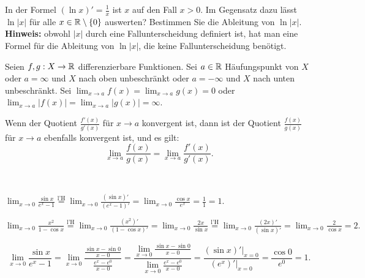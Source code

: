 \begin{aufg} 
	In der Formel $(\ln x)' =\frac{1}{x}$ ist $x$ auf den Fall $x>0$. Im Gegensatz dazu lässt $\ln |x|$ für alle $x \in \mathbb{R} \setminus \{0\}$ auswerten? Bestimmen Sie die Ableitung von $\ln |x|$. 
	 \textbf{Hinweis:} obwohl $|x|$ durch eine Fallunterscheidung definiert ist, hat man eine Formel für die Ableitung von $\ln |x|$, die keine Fallunterscheidung benötigt. 
\end{aufg} 

\begin{thm}
	Seien $f, g : X \to \mathbb{R}$ differenzierbare Funktionen. Sei $a \in \mathbb{R}$ Häufungspunkt von $X$ oder $a=\infty$ und $X$ nach oben unbeschränkt oder $a = -\infty$ und $X$ nach unten unbeschränkt. Sei $\lim_{x \to a} f(x) = \lim_{x \to a} g(x) = 0$ oder $\lim_{x \to a} |f(x)| = \lim_{x \to a} |g(x)| = \infty$. 
	
	Wenn der Quotient $\frac{f'(x)}{g'(x)}$ für $x \to a$ konvergent ist, dann ist der Quotient $\frac{f(x)}{g(x)}$ für $x \to a$ ebenfalls konvergent ist, und es gilt: 
	\[
		\lim_{x \to a} \frac{f(x)}{g(x)} = \lim_{x \to a} \frac{f'(x)}{g'(x)}. 
	\]  
\end{thm} 



\begin{bsp} {\  } 
	\begin{enuma} 
		\item $\lim_{x \to 0} \frac{\sin x}{e^x - 1} \stackrel{\text{l'H}}{=} \lim_{x \to 0} \frac{(\sin x)'}{ (e^x - 1)'} = \lim_{x \to 0} \frac{\cos x}{ e^x} = \frac{1}{1} = 1$. 
		\item $\lim_{x \to 0} \frac{x^2}{1 - \cos x} \stackrel{\text{l'H}}{=} \lim_{x \to 0} \frac{ (x^2)'}{ (1- \cos x)'} = \lim_{x \to 0} \frac{ 2 x }{ \sin x} \stackrel{\text{l'H}}{=} \lim_{x \to 0} \frac{(2 x)'}{(\sin x)'}  = \lim_{x \to 0} \frac{ 2}{ \cos x} = 2.$ 
	\end{enuma} 
\end{bsp} 

\begin{bsp}
	\[
		\lim_{x \to 0} \frac{\sin x}{e^x - 1} =\lim_{x \to 0} \frac{ \frac{ \sin x - \sin 0}{x - 0} }{ \frac{e^x - e^0}{x-0} } = \frac{\lim_{x \to 0} \frac{ \sin x - \sin 0}{x - 0}}{\lim_{x \to 0} \frac{e^x - e^0}{x-0}}  = \frac{(\sin x)'|_{x=0}}{ (e^x)'|_{x =0}} = \frac{\cos 0}{ e^0} = 1. 
	\]
\end{bsp} 

